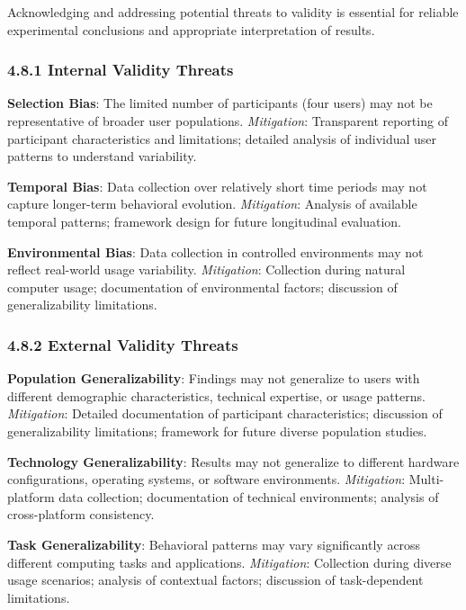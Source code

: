\documentclass[
  11pt,
  a4paper,
]{article}
\begin{document}
Acknowledging and addressing potential threats to validity is essential
for reliable experimental conclusions and appropriate interpretation of
results.

\subsubsection{4.8.1 Internal Validity
Threats}\label{internal-validity-threats}

\textbf{Selection Bias}: The limited number of participants (four users)
may not be representative of broader user populations.
\emph{Mitigation}: Transparent reporting of participant characteristics
and limitations; detailed analysis of individual user patterns to
understand variability.

\textbf{Temporal Bias}: Data collection over relatively short time
periods may not capture longer-term behavioral evolution.
\emph{Mitigation}: Analysis of available temporal patterns; framework
design for future longitudinal evaluation.

\textbf{Environmental Bias}: Data collection in controlled environments
may not reflect real-world usage variability. \emph{Mitigation}:
Collection during natural computer usage; documentation of environmental
factors; discussion of generalizability limitations.

\subsubsection{4.8.2 External Validity
Threats}\label{external-validity-threats}

\textbf{Population Generalizability}: Findings may not generalize to
users with different demographic characteristics, technical expertise,
or usage patterns. \emph{Mitigation}: Detailed documentation of
participant characteristics; discussion of generalizability limitations;
framework for future diverse population studies.

\textbf{Technology Generalizability}: Results may not generalize to
different hardware configurations, operating systems, or software
environments. \emph{Mitigation}: Multi-platform data collection;
documentation of technical environments; analysis of cross-platform
consistency.

\textbf{Task Generalizability}: Behavioral patterns may vary
significantly across different computing tasks and applications.
\emph{Mitigation}: Collection during diverse usage scenarios; analysis
of contextual factors; discussion of task-dependent limitations.
\end{document}
